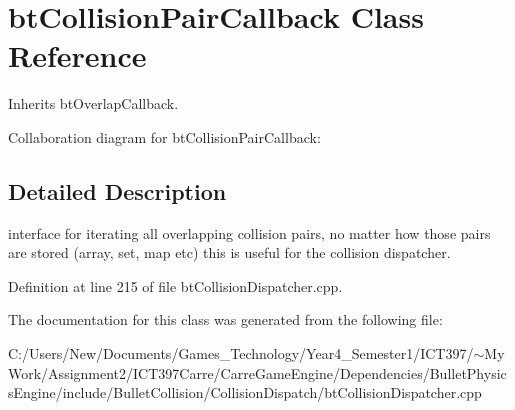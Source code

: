 \hypertarget{classbt_collision_pair_callback}{
\section{btCollisionPairCallback Class Reference}
\label{classbt_collision_pair_callback}
}
Inherits btOverlapCallback.

Collaboration diagram for btCollisionPairCallback:

\subsection{Detailed Description}
interface for iterating all overlapping collision pairs, no matter how those pairs are stored (array, set, map etc) this is useful for the collision dispatcher. 

Definition at line 215 of file btCollisionDispatcher.cpp.

The documentation for this class was generated from the following file:\begin{CompactItemize}
\item 
C:/Users/New/Documents/Games\_\-Technology/Year4\_\-Semester1/ICT397/$\sim$My Work/Assignment2/ICT397Carre/CarreGameEngine/Dependencies/BulletPhysicsEngine/include/BulletCollision/CollisionDispatch/btCollisionDispatcher.cpp\end{CompactItemize}
